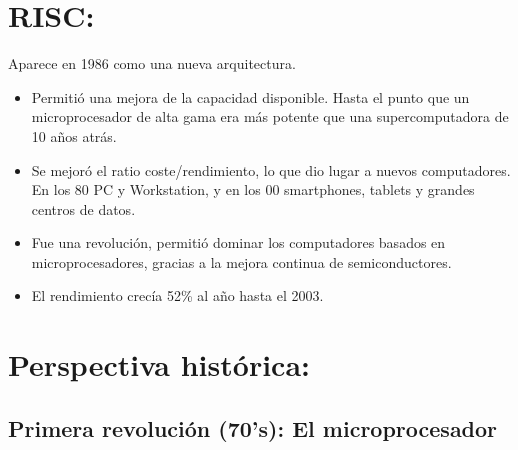 \documentclass[12pt, twoside, openright]{report} %
\begin{document}
  \section{RISC:}

  Aparece en 1986 como una nueva arquitectura.

  \begin{itemize}
  
  \item
    Permitió una mejora de la capacidad disponible. Hasta el punto que
    un microprocesador de alta gama era más potente que una
    supercomputadora de 10 años atrás.
  \item
    Se mejoró el ratio coste/rendimiento, lo que dio lugar a nuevos
    computadores. En los 80 PC y Workstation, y en los 00
    smartphones, tablets y grandes centros de datos.
  \item
    Fue una revolución, permitió dominar los computadores basados en
    microprocesadores, gracias a la mejora continua de semiconductores.
  \item
    El rendimiento crecía 52\% al año hasta el 2003.
  \end{itemize}
\pagebreak
  \section{Perspectiva histórica:}

  \subsection{Primera revolución (70's): El microprocesador}
\end{document}
